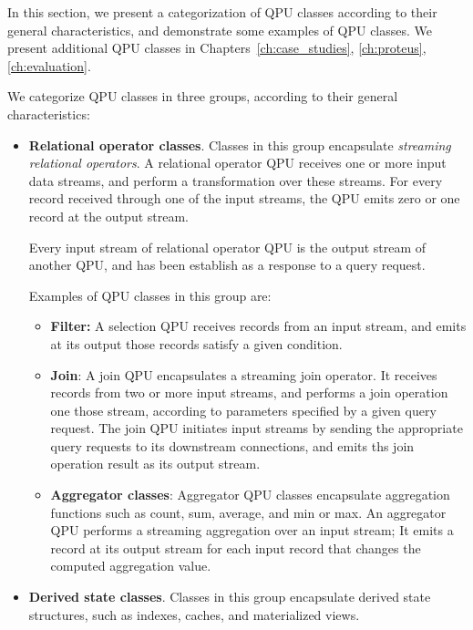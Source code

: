 In this section, we present a categorization of QPU classes according to their general characteristics,
and demonstrate some examples of QPU classes.
We present additional QPU classes in Chapters~\ref{ch:case_studies}, \ref{ch:proteus}, \ref{ch:evaluation}.

We categorize QPU classes in three groups, according to their general characteristics:
\begin{itemize}
  \item \textbf{Relational operator classes}.
  Classes in this group encapsulate \textit{streaming relational operators}.
  A relational operator QPU receives one or more input data streams, and perform a transformation over these streams.
  For every record received through one of the input streams, the QPU emits zero or one record at the output stream.

  Every input stream of relational operator QPU is the output stream of another QPU, and has been establish as a response
  to a query request.

  Examples of QPU classes in this group are:
  \begin{itemize}
    \item \textbf{Filter:}
    A selection QPU receives records from an input stream, and  emits at its output those records satisfy a given condition.

    \item \textbf{Join}:
    A join QPU encapsulates a streaming join operator.
    It receives records from two or more input streams, and performs a join operation one those stream, according
    to parameters specified by a given query request.
    The join QPU initiates input streams by sending the appropriate query requests to its downstream connections,
    and emits ths join operation result as its output stream.

    \item \textbf{Aggregator classes}:
    Aggregator QPU classes encapsulate aggregation functions such as count, sum, average, and min or max.
    An aggregator QPU performs a streaming aggregation over an input stream;
    It emits a record at its output stream for each input record that changes the computed aggregation value.
  \end{itemize}

  \item \textbf{Derived state classes}.
  Classes in this group encapsulate derived state structures, such as indexes, caches, and materialized views.


\end{itemize}
